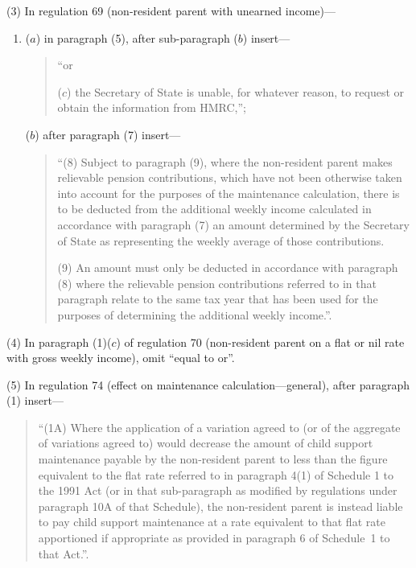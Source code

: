 \documentclass[12pt,a4paper]{article}
\begin{document}
(3) In regulation 69 (non-resident parent with unearned income)—
\begin{enumerate}\item[]
($a$) in paragraph (5), after sub-paragraph ($b$)  insert—
\begin{quotation}
“or

($c$) the Secretary of State is unable, for whatever reason, to request or obtain the information from HMRC,”;
\end{quotation}

($b$) after paragraph (7) insert—
\begin{quotation}
“(8) Subject to paragraph (9), where the non-resident parent makes relievable pension contributions, which have not been otherwise taken into account for the purposes of the maintenance calculation, there is to be deducted from the additional weekly income calculated in accordance with paragraph (7) an amount determined by the Secretary of State as representing the weekly average of those contributions.

(9) An amount must only be deducted in accordance with paragraph (8) where the relievable pension contributions referred to in that paragraph relate to the same tax year that has been used for the purposes of determining the additional weekly income.”.
\end{quotation}
\end{enumerate}

(4) In paragraph (1)($c$)  of regulation 70 (non-resident parent on a flat or nil rate with gross weekly income), omit “equal to or”.

(5) In regulation 74 (effect on maintenance calculation---general), after paragraph (1) insert—
\begin{quotation}
“(1A) Where the application of a variation agreed to (or of the aggregate of variations agreed to) would decrease the amount of child support maintenance payable by the non-resident parent to less than the figure equivalent to the flat rate referred to in paragraph 4(1) of Schedule 1 to the 1991 Act (or in that sub-paragraph as modified by regulations under paragraph 10A of that Schedule), the non-resident parent is instead liable to pay child support maintenance at a rate equivalent to that flat rate apportioned if appropriate as provided in paragraph 6 of Schedule~1 to that Act.”.
\end{quotation}

\bigskip

\pagebreak[3]
\end{document}
